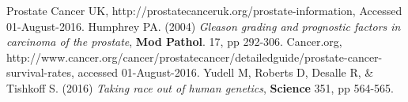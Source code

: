 \documentclass[final]{article}
\begin{document}
\begin{thebibliography}{1}
    Prostate Cancer UK,
    http://prostatecanceruk.org/prostate-information,
    Accessed 01-August-2016.
    Humphrey PA.
    (2004)
    \emph{Gleason grading and prognostic factors in carcinoma of the prostate},
    \textbf{Mod Pathol}.
    17,
    pp 292-306.
    Cancer.org,
    http://www.cancer.org/cancer/prostatecancer/detailedguide/prostate-cancer-survival-rates,
    accessed 01-August-2016.
    Yudell M, Roberts D, Desalle R, \& Tishkoff S.
    (2016)
    \emph{Taking race out of human genetics},
    \textbf{Science}
    351,
    pp 564-565.
\end{thebibliography}
\end{document}
